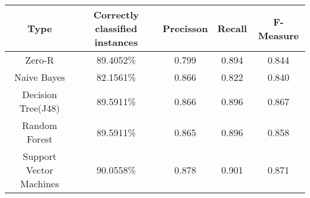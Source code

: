 \begin{center}
 \begin{tabular}{c c c c c} 
 \toprule
 Type
 	& Correctly classified instances
		& Precisson
			& Recall
				& F-Measure
\\ 
 \midrule
Zero-R
 	&  89.4052\%
		& 0.799
			& 0.894
				& 0.844
 \\
 Naive Bayes
 	&  82.1561\%
		& 0.866
			& 0.822
			& 0.840
			 \\ 

 Decision Tree(J48) 
 	& 89.5911\% & 0.866 & 0.896 & 0.867\\
	
 Random Forest
 	& 89.5911\% & 0.865 & 0.896 & 0.858\\	
 
 Support Vector Machines
 	& 90.0558\%
		& 0.878
			& 0.901
			& 0.871
\\

 \bottomrule
\end{tabular}
\end{center}